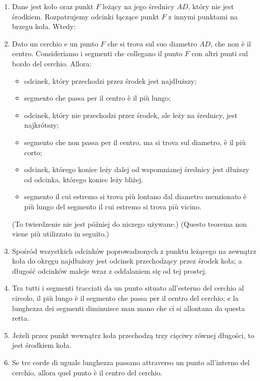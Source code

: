 \begin{enumerate}
    \item [3.7] Dane jest koło oraz punkt $F$ leżący na jego średnicy $AD$, który nie jest środkiem. Rozpatrujemy odcinki łączące punkt $F$ z innymi punktami na brzegu koła. Wtedy: %
    \item [3.7] Dato un cerchio e un punto $F$ che si trova sul suo diametro $AD$, che non è il centro. Consideriamo i segmenti che collegano il punto $F$ con altri punti sul bordo del cerchio. Allora: %
        \begin{itemize}
        \item odcinek, który przechodzi przez środek jest najdłuższy; %
        \item segmento che passa per il centro è il più lungo; %
        \item odcinek, który nie przechodzi przez środek, ale leży na średnicy, jest najkrótszy; %
        \item segmento che non passa per il centro, ma si trova sul diametro, è il più corto; %
        \item odcinek, którego koniec leży dalej od wspomnianej średnicy jest dłuższy od odcinka, którego koniec leży bliżej. %
        \item segmento il cui estremo si trova più lontano dal diametro menzionato è più lungo del segmento il cui estremo si trova più vicino. %
        \end{itemize}
    (To twierdzenie nie jest później do niczego używane.) %
    (Questo teorema non viene più utilizzato in seguito.) %
    
    \item [3.8] Spośród wszystkich odcinków poprowadzonych z punktu leżącego na zewnątrz koła do okręgu najdłuższy jest odcinek przechodzący przez środek koła; a długość odcinków maleje wraz z oddalaniem się od tej prostej. %
    \item [3.8] Tra tutti i segmenti tracciati da un punto situato all'esterno del cerchio al circolo, il più lungo è il segmento che passa per il centro del cerchio; e la lunghezza dei segmenti diminuisce man mano che ci si allontana da questa retta. %

    \item [3.9] Jeżeli przez punkt wewnątrz koła przechodzą trzy cięciwy równej długości, to jest środkiem koła. %
    \item [3.9] Se tre corde di uguale lunghezza passano attraverso un punto all'interno del cerchio, allora quel punto è il centro del cerchio. %


\end{enumerate}
